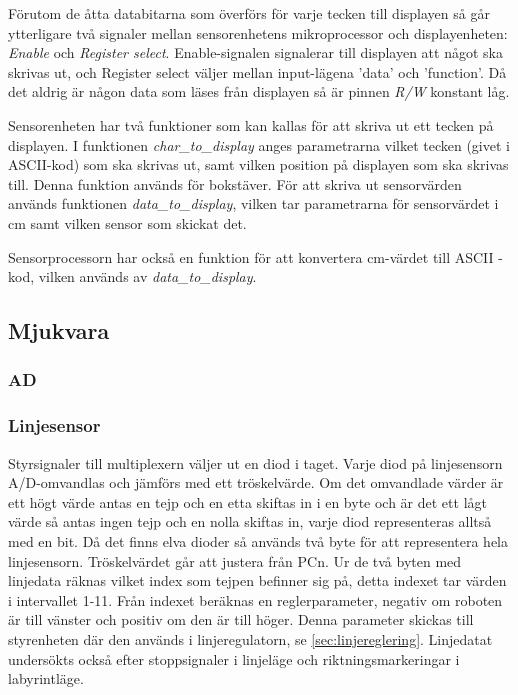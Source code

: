 Förutom de åtta databitarna som överförs för varje tecken till displayen så 
går ytterligare två signaler mellan sensorenhetens mikroprocessor och 
displayenheten: \emph{Enable} och \emph{Register select}. Enable-signalen 
signalerar till displayen att något ska skrivas ut, och Register select 
väljer mellan input-lägena 'data' och 'function'. Då det aldrig är någon data 
som läses från displayen så är pinnen \emph{R/W} konstant låg. 

Sensorenheten har två funktioner som kan kallas för att skriva ut ett tecken 
på displayen. I funktionen \emph{char\_to\_display} anges parametrarna vilket 
tecken (givet i ASCII-kod) som ska skrivas ut, samt vilken position på 
displayen som ska skrivas till. Denna funktion används för bokstäver. För att 
skriva ut sensorvärden används funktionen \emph{data\_to\_display}, vilken 
tar parametrarna för sensorvärdet i cm samt vilken sensor som skickat det. 

Sensorprocessorn har också en funktion för att konvertera cm-värdet till ASCII
-kod, vilken används av \emph{data\_to\_display}.

\subsection{Mjukvara}

\subsubsection{AD}

\subsubsection{Linjesensor}
Styrsignaler till multiplexern väljer ut en diod i taget.
Varje diod på linjesensorn A/D-omvandlas och jämförs med ett tröskelvärde. Om
det omvandlade värder är
ett högt värde antas en tejp och en etta skiftas in i en byte och är det 
ett lågt värde så antas ingen tejp och en nolla skiftas in, varje diod
representeras alltså med en bit. Då det finns elva dioder så används två byte 
för att representera hela linjesensorn. Tröskelvärdet går att justera från PCn. 
Ur de två byten med linjedata räknas vilket index som tejpen befinner sig på,
detta indexet tar värden i intervallet 1-11. Från indexet beräknas en
reglerparameter, negativ om roboten är till vänster och positiv om den är till
höger. Denna parameter skickas till styrenheten där den används i
linjeregulatorn, se \ref{sec:linjereglering}. Linjedatat undersökts också efter
stoppsignaler i linjeläge och riktningsmarkeringar i labyrintläge.


